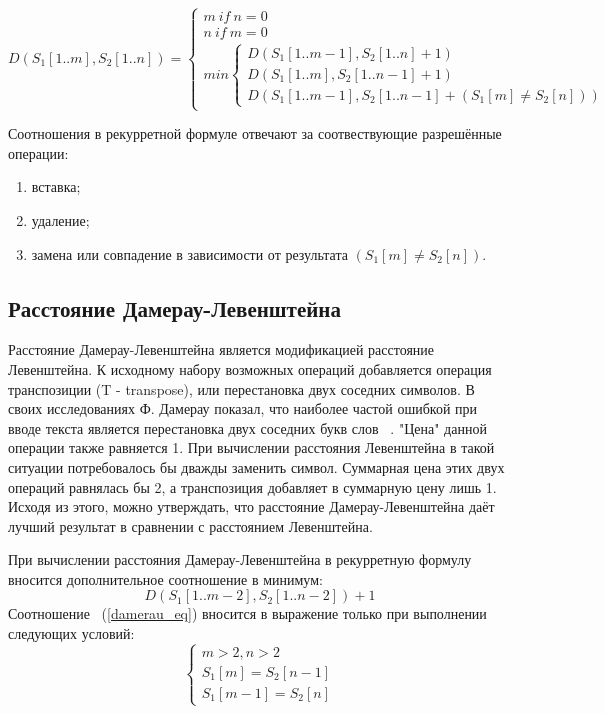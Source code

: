 \documentclass[14pt, a4paper]{report}
\begin{document}
	\begin{equation}
	\label{formula_leven}
	D(S_{1}[1..m], S_{2}[1..n]) = \begin{cases}
	m\ if\ n = 0\\
	n\ if\ m = 0\\
	min \begin{cases}
	D(S_{1}[1..m-1], S_{2}[1..n] + 1)\\
	D(S_{1}[1..m], S_{2}[1..n-1]+1)\\
	D(S_{1}[1..m-1], S_{2}[1..n-1]+(S_{1}[m] \neq S_{2}[n]))
	\end{cases}
	\end{cases}
	\end{equation}
	
	Соотношения в рекурретной формуле отвечают за соотвествующие разрешённые операции:
	\begin{enumerate}
		\item вставка;
		\item удаление;
		\item замена или совпадение в зависимости от результата $(S_{1}[m] \neq S_{2}[n])$.	
	\end{enumerate}

	\subsection{Расстояние Дамерау-Левенштейна}
	Расстояние Дамерау-Левенштейна является модификацией расстояние Левенштейна. К исходному набору возможных операций добавляется операция транспозиции (T - transpose), или перестановка двух соседних символов. В своих исследованиях Ф. Дамерау показал, что наиболее частой ошибкой при вводе текста является перестановка двух соседних букв слов ~\cite{damerau}. "Цена" данной операции также равняется 1. При вычислении расстояния Левенштейна в такой ситуации потребовалось бы дважды заменить символ. Суммарная цена этих двух операций равнялась бы 2, а транспозиция добавляет в суммарную цену лишь 1. Исходя из этого, можно утверждать, что расстояние Дамерау-Левенштейна даёт лучший результат в сравнении с расстоянием Левенштейна.
	
	При вычислении расстояния Дамерау-Левенштейна в рекурретную формулу вносится дополнительное соотношение в минимум:
	\begin{equation}
	\label{damerau_eq}
	D(S_{1}[1..m-2], S_{2}[1..n-2])+1
	\end{equation}
	Соотношение ~(\ref{damerau_eq}) вносится в выражение только при выполнении следующих условий:
	\begin{equation}
	\label{damerau_conditions}
	\begin{cases}
		m > 2,n > 2\\
		S_{1}[m] = S_{2}[n-1]\\
		S_{1}[m-1] = S_{2}[n]
	\end{cases}	
	\end{equation}
	
\end{document}
